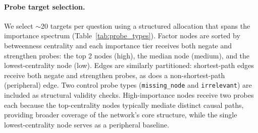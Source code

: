 \documentclass[11pt]{article}
\begin{document}
\paragraph{Probe target selection.} We select ${\sim}$20 targets per question using a structured allocation that spans the importance spectrum (Table~\ref{tab:probe_types}). Factor nodes are sorted by betweenness centrality and each importance tier receives both negate and strengthen probes: the top 2 nodes (high), the median node (medium), and the lowest-centrality node (low). Edges are similarly partitioned: shortest-path edges receive both negate and strengthen probes, as does a non-shortest-path (peripheral) edge. Two control probe types (\texttt{missing\_node} and \texttt{irrelevant}) are included as structural validity checks. High-importance nodes receive two probes each because the top-centrality nodes typically mediate distinct causal paths, providing broader coverage of the network's core structure, while the single lowest-centrality node serves as a peripheral baseline.
\end{document}
